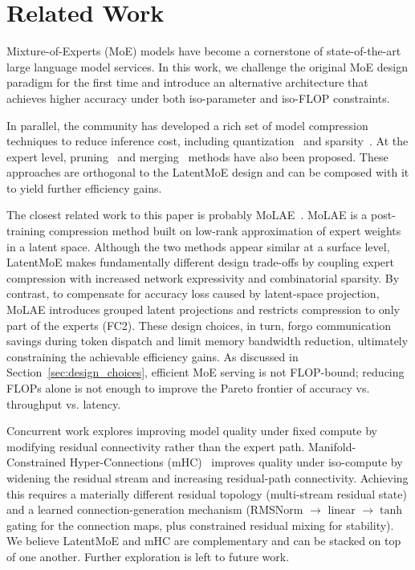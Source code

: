 \section{Related Work}
\label{sec:discussion}

Mixture-of-Experts (MoE) models have become a cornerstone of state-of-the-art large language model services. In this work, we challenge the original MoE design paradigm for the first time and introduce an alternative architecture that achieves higher accuracy under both iso-parameter and iso-FLOP constraints.


In parallel, the community has developed a rich set of model compression techniques to reduce inference cost, including quantization~\citep{rouhani2023microscalingdataformatsdeep, shared_microexponents} and sparsity~\citep{xie2024moeprunerpruningmixtureofexpertslarge}. At the expert level, pruning~\citep{not_all_experts_are_equal, reap_the_experts, chen2022taskspecificexpertpruningsparse} and merging~\citep{li2024mergecompressdemystifyefficient} methods have also been proposed. These approaches are orthogonal to the LatentMoE design and can be composed with it to yield further efficiency gains.

The closest related work to this paper is probably MoLAE~\citep{molae}. MoLAE is a post-training compression method built on low-rank approximation of expert weights in a latent space. Although the two methods appear similar at a surface level, LatentMoE makes fundamentally different design trade-offs by coupling expert compression with increased network expressivity and combinatorial sparsity. By contrast, to compensate for accuracy loss caused by latent-space projection, MoLAE introduces grouped latent projections and restricts compression to only part of the experts (FC2). These design choices, in turn, forgo communication savings during token dispatch and limit memory bandwidth reduction, ultimately constraining the achievable efficiency gains. As discussed in Section~\ref{sec:design_choices}, efficient MoE serving is not FLOP-bound; reducing FLOPs alone is not enough to improve the Pareto frontier of accuracy vs. throughput vs. latency.

Concurrent work explores improving model quality under fixed compute by modifying residual connectivity rather than the expert path. Manifold-Constrained Hyper-Connections (mHC)~\citep{xie2026mhcmanifoldconstrainedhyperconnections} improves quality under iso-compute by widening the residual stream and increasing residual-path connectivity.
Achieving this requires a materially different residual topology (multi-stream residual state) and a learned connection-generation mechanism (RMSNorm $\rightarrow$ linear $\rightarrow \tanh$ gating for the connection maps, plus constrained residual mixing for stability). We believe LatentMoE and mHC are complementary and can be stacked on top of one another. Further exploration is left to future work.
